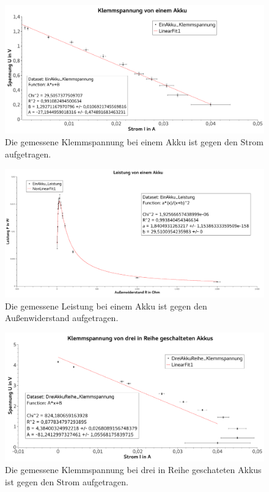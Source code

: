 \documentclass[
	a4paper,
	12pt,
	pagesize,
	ngerman
]{scrartcl}
\begin{document}
	\begin{figure}[tb]
		\includegraphics[width=1\textwidth]{Spannung1}
		\centering
		\caption{Die gemessene Klemmspannung bei einem Akku ist gegen den Strom aufgetragen.}
		\label{Spannung1}
		\centering
	\end{figure} 
	\begin{figure}[tb]
		\includegraphics[width=1\textwidth]{Leistung1}
		\centering
		\caption{Die gemessene Leistung bei einem Akku ist gegen den Außenwiderstand aufgetragen.}
		\label{Leistung1}
		\centering
	\end{figure}
	\begin{figure}[tb]
		\includegraphics[width=1\textwidth]{Spannung3Reihe}
		\centering
		\caption{Die gemessene Klemmspannung bei drei in Reihe geschateten Akkus ist gegen den Strom aufgetragen.}
		\label{Spannung3Reihe}
		\centering
	\end{figure} 
\end{document}
